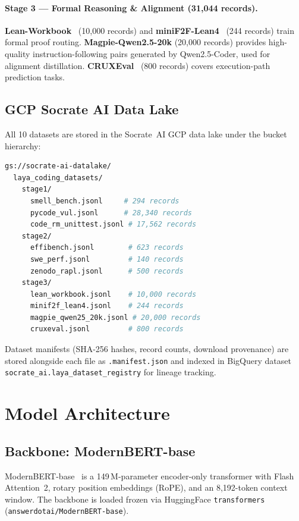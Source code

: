 \documentclass[conference]{IEEEtran}
\begin{document}
\paragraph{Stage 3 — Formal Reasoning \& Alignment (31{,}044 records).}
\textbf{Lean-Workbook}~\cite{ying2024leanworkbook} (10{,}000 records) and
\textbf{miniF2F-Lean4}~\cite{zheng2022minif2f} (244 records) train formal proof routing.
\textbf{Magpie-Qwen2.5-20k} (20{,}000 records) provides high-quality instruction-following
pairs generated by Qwen2.5-Coder, used for alignment distillation.
\textbf{CRUXEval}~\cite{gu2024cruxeval} (800 records) covers execution-path prediction tasks.

\subsection{GCP Socrate AI Data Lake}

All 10 datasets are stored in the Socrate~AI GCP data lake under the bucket hierarchy:
\begin{lstlisting}[language=bash]
gs://socrate-ai-datalake/
  laya_coding_datasets/
    stage1/
      smell_bench.jsonl     # 294 records
      pycode_vul.jsonl      # 28,340 records
      code_rm_unittest.jsonl # 17,562 records
    stage2/
      effibench.jsonl        # 623 records
      swe_perf.jsonl         # 140 records
      zenodo_rapl.jsonl      # 500 records
    stage3/
      lean_workbook.jsonl    # 10,000 records
      minif2f_lean4.jsonl    # 244 records
      magpie_qwen25_20k.jsonl # 20,000 records
      cruxeval.jsonl         # 800 records
\end{lstlisting}

Dataset manifests (SHA-256 hashes, record counts, download provenance) are stored alongside
each file as \texttt{.manifest.json} and indexed in BigQuery dataset
\texttt{socrate\_ai.laya\_dataset\_registry} for lineage tracking.

\section{Model Architecture}
\label{sec:architecture}

\subsection{Backbone: ModernBERT-base}

ModernBERT-base~\cite{warner2024modernbert} is a 149\,M-parameter encoder-only transformer
with Flash Attention~2, rotary position embeddings (RoPE), and an 8{,}192-token context window.
The backbone is loaded frozen via HuggingFace \texttt{transformers}
(\texttt{answerdotai/ModernBERT-base}).
\end{document}
